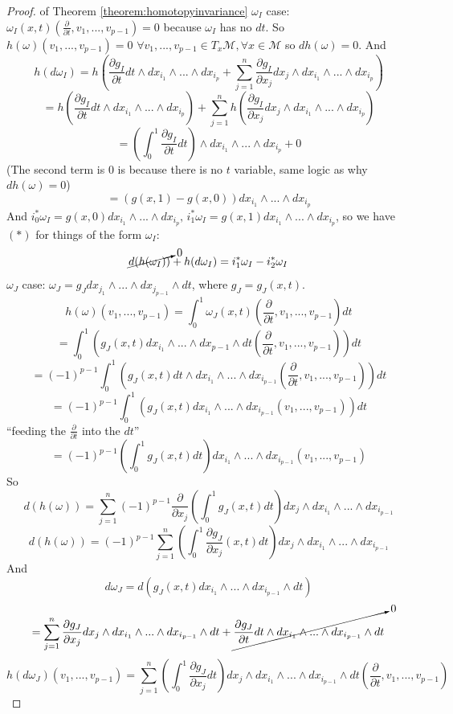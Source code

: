 \documentclass[10pt]{article}
\theoremstyle{plain}
\theoremstyle{definition}
\newcommand{\man}{\mathcal{M}}
\newcommand{\xman}{x\in\man}
\newcommand{\allthevs}[2]{v_{#1},...,v_{#2}}
\newcommand{\allthewedge}[3]{{#1}_{#2}\wedge...\wedge{#1}_{#3}}
\newcommand{\tang}{T_x\man}
\newcommand{\dx}{dx}
\newcommand{\deriv}{d}
\newcommand{\dw}{d\omega}
\newcommand{\dt}{\deriv t}
\newcommand{\sumfromto}[2]{\sum\limits_{#1}^{#2}}
\newcommand{\parderiv}[1]{\frac{\partial}{\partial {#1}}}
\begin{document}
\begin{proof}{of Theorem \ref{theorem:homotopyinvariance}}
$\omega _I$ case: $\omega_I(x,t)\left(\parderiv{t} , v_1,...,v_{p-1}\right) = 0$ because $\omega_I$ has no $\dt$. So $h(\omega)(\allthevs{1}{p-1})=0\,\,\forall \allthevs{1}{p-1}\in \tang, \forall \xman$ so $\deriv h(\omega) = 0$. And $$h(\dw_I) = h\left(\frac{\partial g_I}{\partial t} \dt \wedge \allthewedge{\dx}{i_1}{i_p} + \sumfromto{j=1}{n}\frac{\partial g_I}{\partial x_j}\dx_j \wedge \allthewedge{\dx}{i_1}{i_p}\right)$$
$$= h\left(\frac{\partial g_I}{\partial t} \dt \wedge \allthewedge{\dx}{i_1}{i_p}\right) + \sumfromto{j=1}{n} h\left( \frac{\partial g_I}{\partial x_j}\dx_j \wedge \allthewedge{\dx}{i_1}{i_p}\right)$$
$$ = \left(\int_0^1\frac{\partial g_I}{\partial t}\dt \right)\wedge \allthewedge{\dx}{i_1}{i_p} + 0$$
(The second term is 0 is because there is no $t$ variable, same logic as why $\deriv h(\omega) = 0$)
$$= \left(g(x,1)-g(x,0)\right)\allthewedge{\dx}{i_1}{i_p}$$
And $i_0^*\omega_I = g(x,0)\allthewedge{\dx}{i_1}{i_p},\, i_1^*\omega_I = g(x,1)\allthewedge{\dx}{i_1}{i_p}$, so we have $(*)$ for things of the form $\omega_I$:
$$\cancelto{0}{\deriv(h(\omega_I))} + h(\dw_I) = i_1^* \omega_I - i_2^*\omega_I$$
$\omega_J$ case: $\omega _J = g_J \allthewedge{\dx}{j_1}{j_{p-1}} \wedge \dt$, where $g_J = g_J(x,t)$.
$$h(\omega) (\allthevs{1}{p-1}) = \int_0^1 \omega_J(x,t) \left(\parderiv{t},\allthevs{1}{p-1}\right) \dt$$
$$ = \int_0^1 \left(g_J(x,t) \allthewedge{\dx}{i_1}{p-1}\wedge \dt \left(\parderiv{t} , \allthevs{1}{p-1}\right)\right)\dt$$
$$= (-1)^{p-1}\int_0^1 \left(g_J(x,t) \dt \wedge \allthewedge{\dx}{i_1}{i_{p-1}}\left(\parderiv{t},\allthevs{1}{p-1}\right)\right)\dt$$
$$= (-1)^{p-1}\int_0^1 \left(g_J(x,t) \allthewedge{\dx}{i_1}{i_{p-1}}\left(\allthevs{1}{p-1}\right)\right)\dt$$
``feeding the $\parderiv{t} $ into the $\dt$''
$$= (-1)^{p-1}\left(\int_0^1 g_J(x,t)\dt\right) \allthewedge{\dx}{i_1}{i_{p-1}}\left(\allthevs{1}{p-1}\right)$$
So $$\deriv(h(\omega)) = \sumfromto{j=1}{n} (-1)^{p-1} \parderiv{x_j} \left(\int_0^1 g_J(x,t)\dt\right)\dx_j \wedge \allthewedge{\dx}{i_1}{i_{p-1}}$$
$$\deriv (h(\omega))= (-1)^{p-1} \sumfromto{j=1}{n} \left(\int_0^1 \frac{\partial g_J}{\partial x_j}(x,t)\dt\right)\dx_j \wedge \allthewedge{\dx}{i_1}{i_{p-1}}$$
And 
$$\dw _J = \deriv( g_J(x,t) \allthewedge{\dx}{i_1}{i_{p-1}}\wedge \dt)$$
$$ = \sumfromto{j=1}{n} \frac{\partial g_J}{\partial x_j} \dx_j \wedge \allthewedge{\dx}{i_1}{i_{p-1}} \wedge \dt + \cancelto{0}{\frac{\partial g_J}{\partial t} \dt \wedge \allthewedge{\dx}{i_1}{i_{p-1}}\wedge \dt}$$
$$h(\dw_J)(\allthevs{1}{p-1}) = \sumfromto{j=1}{n} \left(\int_0^1 \frac{\partial g_J}{\partial x_j} \dt\right)\dx_j \wedge \allthewedge{\dx}{i_1}{i_{p-1}}\wedge\dt\left(\parderiv{t},\allthevs{1}{p-1}\right)$$

\end{proof}
\end{document}
